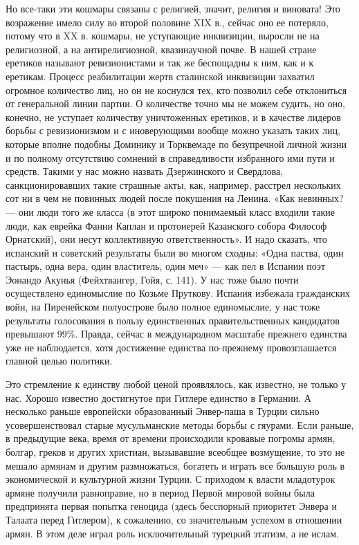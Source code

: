 Но все-таки эти кошмары связаны с религией, значит, религия и виновата! Это
возражение имело силу во второй половине XIX в., сейчас оно ее потеряло, потому
что в XX в. кошмары, не уступающие инквизиции, выросли не на религиозной, а на
антирелигиозной, квазинаучной почве. В нашей стране еретиков называют
ревизионистами и так же беспощадны к ним, как и к еретикам. Процесс
реабилитации жертв сталинской инквизиции захватил огромное количество лиц, но
он не коснулся тех, кто позволил себе отклониться от генеральной линии партии.
О количестве точно мы не можем судить, но оно, конечно, не уступает количеству
уничтоженных еретиков, и в качестве лидеров борьбы с ревизионизмом и с
иноверующими вообще можно указать таких лиц, которые вполне подобны Доминику и
Торквемаде по безупречной личной жизни и по полному отсутствию сомнений в
справедливости избранного ими пути и средств. Такими у нас можно назвать
Дзержинского и Свердлова, санкционировавших такие страшные акты, как, например,
расстрел нескольких сот ни в чем не повинных людей после покушения на Ленина.
«Как невинных? --- они люди того же класса (в этот широко понимаемый класс
входили такие люди, как еврейка Фанни Каплан и протоиерей Казанского собора
Философ Орнатский), они несут коллективную ответственность». И надо сказать,
что испанский и советский результаты были во многом сходны: «Одна паства, один
пастырь, одна вера, один властитель, один меч» --- как пел в Испании поэт Эонандо
Акунья (Фейхтвангер, Гойя, с. 141). У нас тоже было почти осуществлено
единомыслие по Козьме Пруткову. Испания избежала гражданских войн, на
Пиренейском полуострове было полное единомыслие, у нас тоже результаты
голосования в пользу единственных правительственных кандидатов превышают 99\%.
Правда, сейчас в международном масштабе прежнего единства уже не наблюдается,
хотя достижение единства по-прежнему провозглашается главной целью политики.

Это стремление к единству любой ценой проявлялось, как известно, не только у
нас. Хорошо известно достигнутое при Гитлере единство в Германии. А несколько
раньше европейски образованный Энвер-паша в Турции сильно усовершенствовал
старые мусульманские методы борьбы с гяурами. Если раньше, в предыдущие века,
время от времени
происходили кровавые погромы армян, болгар, греков и других христиан,
вызывавшие всеобщее возмущение, то это не мешало армянам и другим размножаться,
богатеть и играть все большую роль в экономической и культурной жизни Турции. С
приходом к власти младотурок армяне получили равноправие, но в период Первой
мировой войны была предпринята первая попытка геноцида (здесь бесспорный
приоритет Энвера и Талаата перед Гитлером), к сожалению, со значительным
успехом в отношении армян. В этом деле играл роль исключительный турецкий
этатизм, а не ислам.

